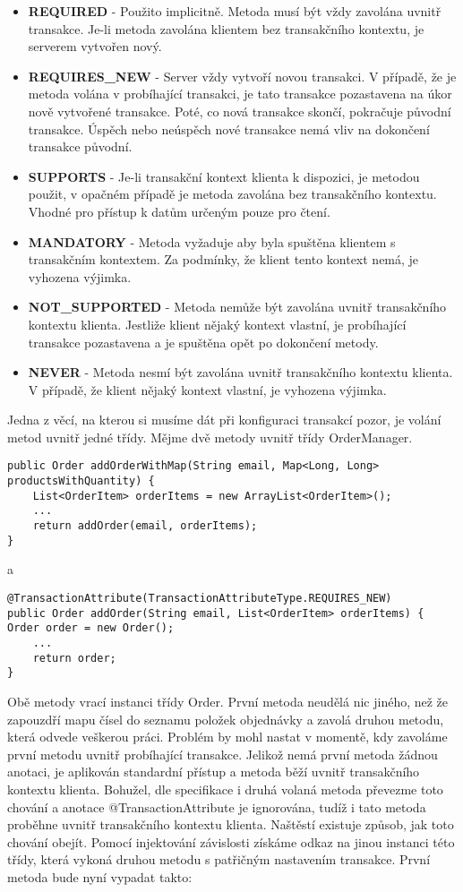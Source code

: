 \documentclass[122pt,oneside]{fithesis}
\begin{document}
\begin{itemize}
  \item {\bf REQUIRED} - Použito implicitně. Metoda musí být vždy zavolána uvnitř transakce. Je-li metoda zavolána klientem bez transakčního kontextu, je serverem vytvořen nový.
  \item {\bf REQUIRES\_NEW} - Server vždy vytvoří novou transakci. V případě, že je metoda volána v probíhající transakci, je tato transakce pozastavena na úkor nově vytvořené transakce. Poté, co nová transakce skončí, pokračuje původní transakce. Úspěch nebo neúspěch nové transakce nemá vliv na dokončení transakce původní.
  \item {\bf SUPPORTS} - Je-li transakční kontext klienta k dispozici, je metodou použit, v opačném případě je metoda zavolána bez transakčního kontextu. Vhodné pro přístup k datům určeným pouze pro čtení.
  \item {\bf MANDATORY} - Metoda vyžaduje aby byla spuštěna klientem s transakčním kontextem. Za podmínky, že klient tento kontext nemá, je vyhozena výjimka.
  \item {\bf NOT\_SUPPORTED} - Metoda nemůže být zavolána uvnitř transakčního kontextu klienta. Jestliže klient nějaký kontext vlastní, je probíhající transakce pozastavena a je spuštěna opět po dokončení metody.
  \item {\bf NEVER} - Metoda nesmí být zavolána uvnitř transakčního kontextu klienta. V případě, že klient nějaký kontext vlastní, je vyhozena výjimka.
\end{itemize}
Jedna z věcí, na kterou si musíme dát při konfiguraci transakcí pozor, je volání metod uvnitř jedné třídy. Mějme dvě metody uvnitř třídy OrderManager.

\begin{lstlisting}
public Order addOrderWithMap(String email, Map<Long, Long> productsWithQuantity) {
	List<OrderItem> orderItems = new ArrayList<OrderItem>();
	...
	return addOrder(email, orderItems);
}
\end{lstlisting}

a

\begin{lstlisting}
@TransactionAttribute(TransactionAttributeType.REQUIRES_NEW)
public Order addOrder(String email, List<OrderItem> orderItems) {
Order order = new Order();
	...
	return order;
}
\end{lstlisting}

Obě metody vrací instanci třídy Order. První metoda neudělá nic jiného, než že zapouzdří mapu čísel do seznamu položek objednávky a zavolá druhou metodu, která odvede veškerou práci. Problém by mohl nastat v momentě, kdy zavoláme první metodu uvnitř probíhající transakce. Jelikož nemá první metoda žádnou anotaci, je aplikován standardní přístup a metoda běží uvnitř transakčního kontextu klienta. Bohužel, dle specifikace i druhá volaná metoda převezme toto chování a anotace @TransactionAttribute je ignorována, tudíž i tato metoda proběhne uvnitř transakčního kontextu klienta. Naštěstí existuje způsob, jak toto chování obejít. Pomocí injektování závislosti získáme odkaz na jinou instanci této třídy, která vykoná druhou metodu s patřičným nastavením transakce. První metoda bude nyní vypadat takto:
\end{document}
